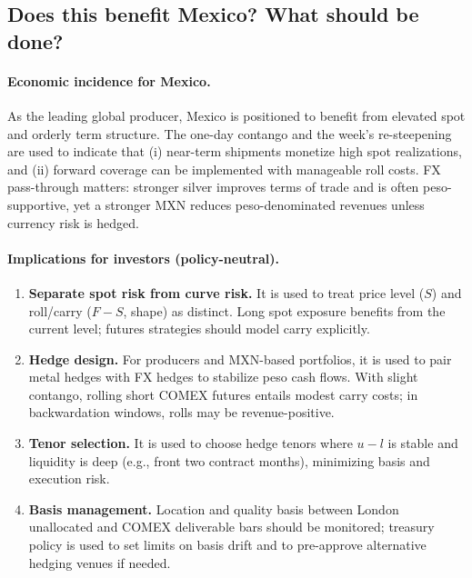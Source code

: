 \documentclass[11pt,a4paper]{article} %
\begin{document}
\subsection{Does this benefit Mexico? What should be done?}

\paragraph{Economic incidence for Mexico.}
As the leading global producer, Mexico is positioned to benefit from elevated spot and orderly term structure. The one-day contango and the week’s re-steepening are used to indicate that (i) near-term shipments monetize high spot realizations, and (ii) forward coverage can be implemented with manageable roll costs. FX pass-through matters: stronger silver improves terms of trade and is often peso-supportive, yet a stronger MXN reduces peso-denominated revenues unless currency risk is hedged.

\paragraph{Implications for investors (policy-neutral).}
\begin{enumerate}
  \item \textbf{Separate spot risk from curve risk.} It is used to treat price level (\(S\)) and roll/carry (\(F-S\), shape) as distinct. Long spot exposure benefits from the current level; futures strategies should model carry explicitly.
  \item \textbf{Hedge design.} For producers and MXN-based portfolios, it is used to pair metal hedges with FX hedges to stabilize peso cash flows. With slight contango, rolling short COMEX futures entails modest carry costs; in backwardation windows, rolls may be revenue-positive.
  \item \textbf{Tenor selection.} It is used to choose hedge tenors where \(u-l\) is stable and liquidity is deep (e.g., front two contract months), minimizing basis and execution risk.
  \item \textbf{Basis management.} Location and quality basis between London unallocated and COMEX deliverable bars should be monitored; treasury policy is used to set limits on basis drift and to pre-approve alternative hedging venues if needed.
\end{enumerate}
\end{document}
